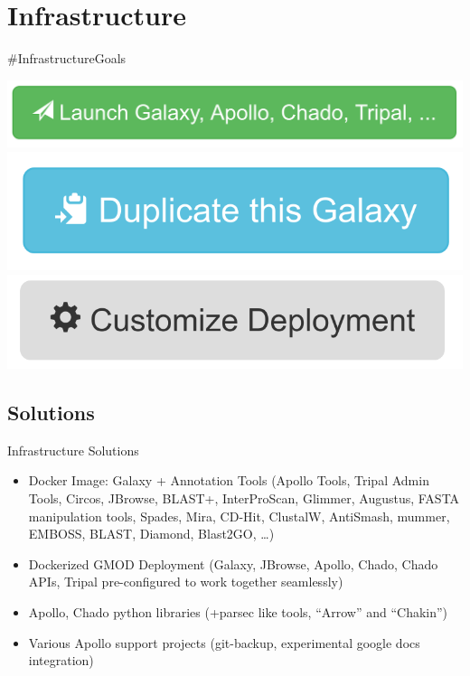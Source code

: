 \documentclass[12pt]{phage3slides} %
\begin{document}
\section{Infrastructure}
\begin{frame}{\#InfrastructureGoals}
    \begin{center}
        \includegraphics[scale=0.2]{img/launch} \\
        \includegraphics[scale=0.2]{img/share} \\
        \includegraphics[scale=0.2]{img/customize} \\
    \end{center}
\end{frame}

\subsection{Solutions}
\begin{frame}{Infrastructure Solutions}
    \begin{itemize}
        \item Docker Image: Galaxy + Annotation Tools {\color{gray}(Apollo Tools, Tripal Admin Tools, Circos, JBrowse, BLAST+, InterProScan, Glimmer, Augustus, FASTA manipulation tools, Spades, Mira, CD-Hit, ClustalW, AntiSmash, mummer, EMBOSS, BLAST, Diamond, Blast2GO, \ldots{})}
        \item Dockerized GMOD Deployment {\color{gray}(Galaxy, JBrowse, Apollo, Chado, Chado APIs, Tripal pre-configured to work together seamlessly)}
        \item Apollo, Chado python libraries {\color{gray}(+parsec like tools, ``Arrow'' and ``Chakin'')}
        \item Various Apollo support projects {\color{gray}(git-backup, experimental google docs integration)}
    \end{itemize}
\end{frame}
\end{document}
